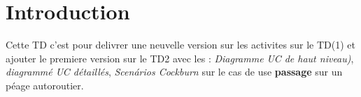 
\chapter{Introduction}
\label{Cap:introduction}
Cette TD c'est pour delivrer une neuvelle version sur les activites sur le TD(1) et ajouter le premiere version sur le TD2 avec les : \textit{Diagramme UC de haut niveau)}, \textit{diagrammé UC détaillés}, \textit{Scenários Cockburn} sur le cas de use \textbf{passage} sur un péage autoroutier.